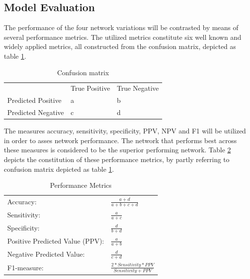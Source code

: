 \documentclass[12pt]{article}
\begin{document}
\clearpage
\subsection{Model Evaluation}
The performance of the four network variations will be contrasted by means of several performance metrics. The utilized metrics constitute six well known and widely applied metrics, all constructed from the confusion matrix, depicted as table \ref{table:confusion}.

\bigskip
\bgroup
\def\arraystretch{1.6}%
\begin{table}[h]
\centering
\caption{Confusion matrix}
\label{table:confusion}
\begin{tabular}{lll}
                                        & True Positive          & True Negative          \\ \cline{2-3} 
\multicolumn{1}{l|}{Predicted Positive} & \multicolumn{1}{l|}{a} & \multicolumn{1}{l|}{b} \\ \cline{2-3} 
\multicolumn{1}{l|}{Predicted Negative} & \multicolumn{1}{l|}{c} & \multicolumn{1}{l|}{d} \\ \cline{2-3} 
\end{tabular}
\end{table}
\egroup

The measures accuracy, sensitivity, specificity, PPV, NPV and F1 will be utilized in order to asses network performance. The network that performs best across these measures is considered to be the superior performing network. Table \ref{table:metrics} depicts the constitution of these performance metrics, by partly referring to confusion matrix depicted as table \ref{table:confusion}. 
\bigskip
\bgroup
\def\arraystretch{1.8}%
\begin{table}[h]
\centering
\caption{Performance Metrics}
\label{table:metrics}
\begin{tabular}{ll}
\hline
Accuracy:                       & \(\frac{\!\!\!\!\!\!\!\!\!\!\!\!\!\!a+d}{a+b+c+d}\) \\
Sensitivity:                    & \(\frac{a}{a+c}\)                                   \\
Specificity:                    & \(\frac{d}{b+d}\)                                   \\
Positive Predicted Value (PPV): & \(\frac{a}{a+b}\)                                   \\
Negative Predicted Value:       & \(\frac{d}{c+d}\)                                   \\
F1-measure:                     & \(\frac{2*Sensitivity*PPV}{Sensitivity+PPV}\)       \\ \hline
\end{tabular}
\end{table}
\egroup

\newpage



\end{document}
